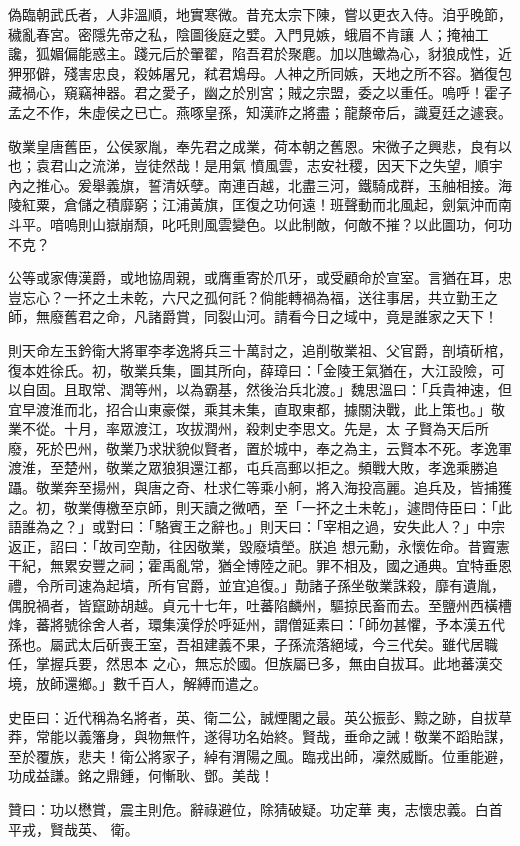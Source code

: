 \begin{pinyinscope}
 偽臨朝武氏者，人非溫順，地實寒微。昔充太宗下陳，嘗以更衣入侍。洎乎晚節，穢亂春宮。密隱先帝之私，陰圖後庭之嬖。入門見嫉，蛾眉不肯讓
 人；掩袖工讒，狐媚偏能惑主。踐元后於翬翟，陷吾君於聚麀。加以虺蠍為心，豺狼成性，近狎邪僻，殘害忠良，殺姊屠兄，弒君鴆母。人神之所同嫉，天地之所不容。猶復包藏禍心，窺竊神器。君之愛子，幽之於別宮；賊之宗盟，委之以重任。嗚呼！霍子孟之不作，朱虛侯之已亡。燕啄皇孫，知漢祚之將盡；龍漦帝后，識夏廷之遽衰。



 敬業皇唐舊臣，公侯冢胤，奉先君之成業，荷本朝之舊恩。宋微子之興悲，良有以也；袁君山之流涕，豈徒然哉！是用氣
 憤風雲，志安社稷，因天下之失望，順宇內之推心。爰舉義旗，誓清妖孽。南連百越，北盡三河，鐵騎成群，玉舳相接。海陵紅粟，倉儲之積靡窮；江浦黃旗，匡復之功何遠！班聲動而北風起，劍氣沖而南斗平。喑嗚則山嶽崩頹，叱吒則風雲變色。以此制敵，何敵不摧？以此圖功，何功不克？



 公等或家傳漢爵，或地協周親，或膺重寄於爪牙，或受顧命於宣室。言猶在耳，忠豈忘心？一抔之土未乾，六尺之孤何託？倘能轉禍為福，送往事居，共立勤王之
 師，無廢舊君之命，凡諸爵賞，同裂山河。請看今日之域中，竟是誰家之天下！



 則天命左玉鈐衛大將軍李孝逸將兵三十萬討之，追削敬業祖、父官爵，剖墳斫棺，復本姓徐氏。初，敬業兵集，圖其所向，薛璋曰：「金陵王氣猶在，大江設險，可以自固。且取常、潤等州，以為霸基，然後治兵北渡。」魏思溫曰：「兵貴神速，但宜早渡淮而北，招合山東豪傑，乘其未集，直取東都，據關決戰，此上策也。」敬業不從。十月，率眾渡江，攻拔潤州，殺刺史李思文。先是，太
 子賢為天后所廢，死於巴州，敬業乃求狀貌似賢者，置於城中，奉之為主，云賢本不死。孝逸軍渡淮，至楚州，敬業之眾狼狽還江都，屯兵高郵以拒之。頻戰大敗，孝逸乘勝追躡。敬業奔至揚州，與唐之奇、杜求仁等乘小舸，將入海投高麗。追兵及，皆捕獲之。初，敬業傳檄至京師，則天讀之微哂，至「一抔之土未乾」，遽問侍臣曰：「此語誰為之？」或對曰：「駱賓王之辭也。」則天曰：「宰相之過，安失此人？」中宗返正，詔曰：「故司空勣，往因敬業，毀廢墳塋。朕追
 想元勳，永懷佐命。昔竇憲干紀，無累安豐之祠；霍禹亂常，猶全博陸之祀。罪不相及，國之通典。宜特垂恩禮，令所司速為起墳，所有官爵，並宜追復。」勣諸子孫坐敬業誅殺，靡有遺胤，偶脫禍者，皆竄跡胡越。貞元十七年，吐蕃陷麟州，驅掠民畜而去。至鹽州西橫槽烽，蕃將號徐舍人者，環集漢俘於呼延州，謂僧延素曰：「師勿甚懼，予本漢五代孫也。屬武太后斫喪王室，吾祖建義不果，子孫流落絕域，今三代矣。雖代居職任，掌握兵要，然思本
 之心，無忘於國。但族屬已多，無由自拔耳。此地蕃漢交境，放師還鄉。」數千百人，解縛而遣之。



 史臣曰：近代稱為名將者，英、衛二公，誠煙閣之最。英公振彭、黥之跡，自拔草莽，常能以義籓身，與物無忤，遂得功名始終。賢哉，垂命之誡！敬業不蹈貽謀，至於覆族，悲夫！衛公將家子，綽有渭陽之風。臨戎出師，凜然威斷。位重能避，功成益謙。銘之鼎鍾，何慚耿、鄧。美哉！



 贊曰：功以懋賞，震主則危。辭祿避位，除猜破疑。功定華
 夷，志懷忠義。白首平戎，賢哉英、
 衛。



\end{pinyinscope}